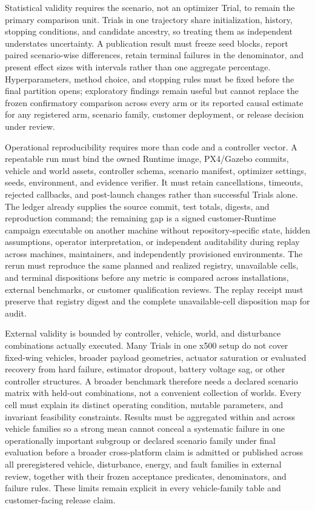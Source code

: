 Statistical validity requires the scenario, not an optimizer Trial, to
remain the primary comparison unit. Trials in one trajectory share
initialization, history, stopping conditions, and candidate ancestry, so
treating them as independent understates uncertainty. A publication
result must freeze seed blocks, report paired scenario-wise differences,
retain terminal failures in the denominator, and present effect sizes
with intervals rather than one aggregate percentage. Hyperparameters,
method choice, and stopping rules must be fixed before the final
partition opens;
exploratory findings remain useful but cannot replace the frozen
confirmatory comparison across every arm or its reported causal
estimate for any registered arm, scenario family, customer deployment, or
release decision under review.

Operational reproducibility requires more than code and a controller
vector. A repeatable run must bind the owned Runtime image, PX4/Gazebo
commits, vehicle and world assets, controller schema, scenario manifest,
optimizer settings, seeds, environment, and evidence verifier. It must
retain cancellations, timeouts, rejected callbacks, and post-launch
changes rather than successful Trials alone. The ledger already supplies
the source commit, test totals, digests, and reproduction command; the
remaining gap is a signed customer-Runtime
campaign executable on another machine without repository-specific
state, hidden assumptions, operator interpretation, or independent
auditability during replay across machines, maintainers, and independently
provisioned environments. The rerun must reproduce the same planned and
realized registry, unavailable cells, and terminal dispositions before
any metric is compared across installations, external benchmarks, or
customer qualification reviews. The replay receipt must preserve that
registry digest and the complete unavailable-cell disposition map for
audit.

External validity is bounded by controller, vehicle, world, and
disturbance combinations actually executed. Many Trials in one x500
setup do not cover fixed-wing vehicles, broader payload geometries,
actuator saturation or evaluated recovery from hard failure, estimator
dropout, battery voltage sag, or other controller structures. A broader
benchmark therefore needs a declared scenario matrix with held-out
combinations, not a convenient collection of worlds. Every cell must
explain its distinct operating condition, mutable parameters, and
invariant feasibility constraints. Results must be aggregated within and
across vehicle families so a strong
mean cannot conceal a systematic failure in one operationally important
subgroup or declared scenario family under final evaluation before a
broader cross-platform claim is admitted or published across all
preregistered vehicle, disturbance, energy, and fault families in
external review, together with their frozen acceptance predicates,
denominators, and failure rules. These limits remain explicit in every
vehicle-family table and customer-facing release claim.

